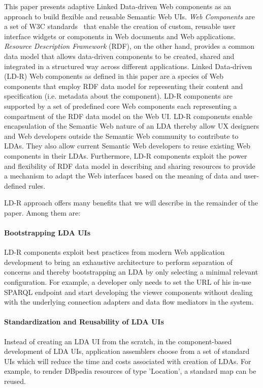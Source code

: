\documentclass{acm_proc_article-sp}
\begin{document}
This paper presents adaptive Linked Data-driven Web components as an approach to build flexible and reusable Semantic Web UIs.
\emph{Web Components} are a set of W3C standards~\cite{webcomponentsW3C} that enable the creation of custom, reusable user interface widgets or components in Web documents and Web applications.  
\emph{Resource Description Framework} (RDF), on the other hand, provides a common data model that allows data-driven components to be created, shared and integrated in a structured way across different applications.
Linked Data-driven (LD-R) Web components as defined in this paper are a species of Web components that employ RDF data model for representing their content and specification (i.e. metadata about the component).
LD-R components are supported by a set of predefined core Web components each representing a compartment of the RDF data model on the Web UI.
LD-R components enable encapsulation of the Semantic Web nature of an LDA thereby allow UX designers and Web developers outside the Semantic Web community to contribute to LDAs.
They also allow current Semantic Web developers to reuse existing Web components in their LDAs.
Furthermore, LD-R components exploit the power and flexibility of RDF data model in describing and sharing resources to provide a mechanism to adapt the Web interfaces based on the meaning of data and user-defined rules. 

LD-R approach offers many benefits that we will describe in the remainder of the paper. Among them are:

\paragraph{Bootstrapping LDA UIs} 
LD-R components exploit best practices from modern Web application development to bring an exhaustive architecture to perform separation of concerns and thereby bootstrapping an LDA by only selecting a minimal relevant configuration.
For example, a developer only needs to set the URL of his in-use SPARQL endpoint and start developing the viewer components without dealing with the underlying connection adapters and data flow mediators in the system.

\paragraph{Standardization and Reusability of LDA UIs} 
Instead of creating an LDA UI from the scratch, in the component-based development of LDA UIs, application assemblers choose from a set of standard UIs which will reduce the time and costs associated with creation of LDAs.
For example, to render DBpedia resources of type 'Location', a standard map can be reused.
\end{document}
